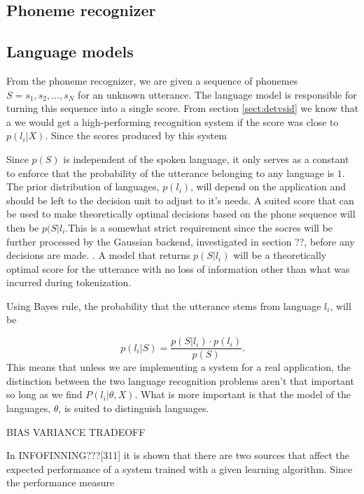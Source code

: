 \subsection{Phoneme recognizer}
\label{sect:phnrec}




\subsection{Language models}
\label{sect:basiclangmodel}

From the phoneme recognizer, we are given a sequence of phonemes $S = s_1, s_2, ... , s_N$ for an unknown utterance. The language model is responsible for turning this sequence into a single score. From section \ref{sect:detvsid} we know that a we would get a high-performing recognition system if the score was close to $p(l_i|X)$. Since the scores produced by this system

Since $p(S)$ is independent of the spoken language, it only serves as a constant to enforce that the probability of the utterance belonging to any language is $1$. The prior distribution of languages, $p(l_i)$, will depend on the application and should be left to the decision unit to adjust to it's needs. A suited score that can be used to make theoretically optimal decisions based on the phone sequence will then be $p(S|l_i$.This is a somewhat strict requirement since the socres will be further processed by the Gaussian backend, investigated in section ??, before any decisions are made. . A model that returns $p(S|l_i)$ will be a theoretically optimal score for the utterance with no loss of information other than what was incurred during tokenization.


Using Bayes rule, the probability that the utterance stems from language $l_i$, will be

\begin{equation}
\label{basebayes}
p(l_i|S) = \frac{p(S|l_i) \cdot p(l_i)}{p(S)}.
\end{equation}
This means that unless we are implementing a system for a real application, the distinction between the two language recognition problems aren't that important so long as we find $P(l_i | \theta, X)$. What is more important is that the model of the languages, $\theta$, is suited to distinguish languages.

BIAS VARIANCE TRADEOFF

In INFOFINNING???[311] it is shown that there are two sources that affect the expected performance of a system trained with a given learning algorithm. Since the performance measure



